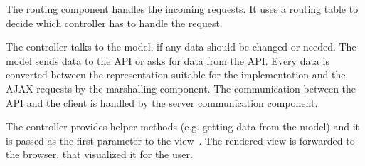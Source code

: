 The routing component handles the incoming requests. It uses a routing table to decide which controller has to handle the request.

The controller talks to the model, if any data should be changed or needed. The model sends data to the API or asks for data from the API. Every data is converted between the representation suitable for the implementation and the AJAX requests by the marshalling component. The communication between the API and the client is handled by the server communication component.

The controller provides helper methods (e.g. getting data from the model) and it is passed as the first parameter to the view~\cite{Mithril-routing}. The rendered view is forwarded to the browser, that visualized it for the user.

